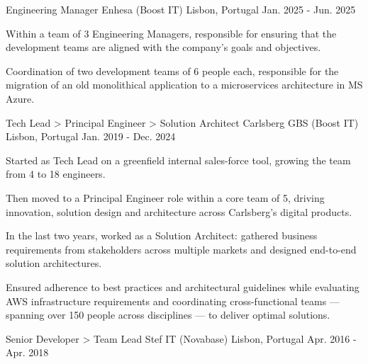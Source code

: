 \begin{cventries}
  \cventry
    {Engineering Manager} %
    {Enhesa (Boost IT)} %
    {Lisbon, Portugal} %
    {Jan. 2025 - Jun. 2025} %
    {
      \begin{cvitems} %
        \item {Within a team of 3 Engineering Managers, responsible for ensuring that the development teams are aligned with the company's goals and objectives.}
        \item {Coordination of two development teams of 6 people each, responsible for the migration of an old monolithical application to a microservices architecture in MS Azure.}
      \end{cvitems}
    }

  \cventry
    {Tech Lead > Principal Engineer > Solution Architect} %
    {Carlsberg GBS (Boost IT)} %
    {Lisbon, Portugal} %
    {Jan. 2019 - Dec. 2024} %
    {
      \begin{cvitems} %
        \item {Started as Tech Lead on a greenfield internal sales-force tool, growing the team from 4 to 18 engineers.}
        \item {Then moved to a Principal Engineer role within a core team of 5, driving innovation, solution design and architecture across Carlsberg's digital products.}
        \item {In the last two years, worked as a Solution Architect: gathered business requirements from stakeholders across multiple markets and designed end-to-end solution architectures.}
        \item {Ensured adherence to best practices and architectural guidelines while evaluating AWS infrastructure requirements and coordinating cross-functional teams — spanning over 150 people across disciplines — to deliver optimal solutions.}
      \end{cvitems}
    }

  \cventry
    {Senior Developer > Team Lead} %
    {Stef IT (Novabase)} %
    {Lisbon, Portugal} %
    {Apr. 2016 - Apr. 2018} %
    {
    }


\end{cventries}
